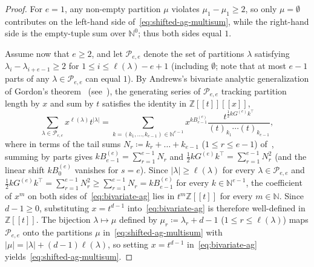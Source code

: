 \documentclass[a4paper, 12pt, reqno]{amsart}
\theoremstyle{remark}
\begin{document}
\begin{proof}
  For $e = 1$,
  any non-empty partition $\mu$ violates $\mu_1 - \mu_1 \ge 2$,
  so only $\mu = \emptyset$ contributes on the left-hand side of~\eqref{eq:shifted-ag-multisum},
  while the right-hand side is the empty-tuple sum over $\mathbb{N}^0$;
  thus both sides equal $1$.

  Assume now that $e \ge 2$,
  and let $\mathcal{P}_{e, e}$ denote the set of partitions $\lambda$ satisfying $\lambda_i - \lambda_{i + e - 1} \ge 2$ for $1 \le i \le \ell(\lambda) - e + 1$
  (including $\emptyset$;
  note that at most $e - 1$ parts of any $\lambda \in \mathcal{P}_{e, e}$ can equal $1$).
  By Andrews's bivariate analytic generalization of Gordon's theorem~\cite{andrews_analytic_1974}
  (see~\cite[Section~7.3, proofs of Theorems~7.5 and~7.8]{andrews_partitions_1976}),
  the generating series of $\mathcal{P}_{e, e}$ tracking partition length by $x$ and sum by $t$ satisfies the identity in $\mathbb{Z}[[t]][[x]]$,
  \begin{equation}
    \label{eq:bivariate-ag}
    \sum_{\lambda \in \mathcal{P}_{e, e}} x^{\ell(\lambda)} t^{|\lambda|}
    = \sum_{k = (k_1, \dots, k_{e - 1}) \in \mathbb{N}^{e - 1}} x^{kB^{(e)}_{e - 1}} \frac{t^{\frac{1}{2}kG^{(e)}k^\top}}{(t)_{k_1} \cdots (t)_{k_{e - 1}}},
  \end{equation}
  where in terms of the tail sums $N_r \coloneq k_r + \dots + k_{e - 1}$ ($1 \le r \le e - 1$) of~\cite[Section~7.3]{andrews_partitions_1976},
  summing by parts gives $kB^{(e)}_{e - 1} = \sum_{r = 1}^{e - 1} N_r$ and $\frac{1}{2}kG^{(e)}k^\top = \sum_{r = 1}^{e - 1} N_r^2$
  (and the linear shift $kB^{(e)}_0$ vanishes for $s = e$).
  Since $|\lambda| \ge \ell(\lambda)$ for every $\lambda \in \mathcal{P}_{e, e}$
  and $\frac{1}{2}kG^{(e)}k^\top = \sum_{r = 1}^{e - 1} N_r^2 \ge \sum_{r = 1}^{e - 1} N_r = kB^{(e)}_{e - 1}$ for every $k \in \mathbb{N}^{e - 1}$,
  the coefficient of $x^m$ on both sides of~\eqref{eq:bivariate-ag} lies in $t^m \mathbb{Z}[[t]]$ for every $m \in \mathbb{N}$.
  Since $d - 1 \ge 0$,
  substituting $x = t^{d - 1}$ into~\eqref{eq:bivariate-ag} is therefore well-defined in $\mathbb{Z}[[t]]$.
  The bijection $\lambda \mapsto \mu$ defined by $\mu_r \coloneq \lambda_r + d - 1$ ($1 \le r \le \ell(\lambda)$) maps $\mathcal{P}_{e, e}$ onto the partitions $\mu$ in~\eqref{eq:shifted-ag-multisum} with $|\mu| = |\lambda| + (d - 1)\ell(\lambda)$,
  so setting $x = t^{d - 1}$ in~\eqref{eq:bivariate-ag} yields~\eqref{eq:shifted-ag-multisum}.
\end{proof}
\end{document}

